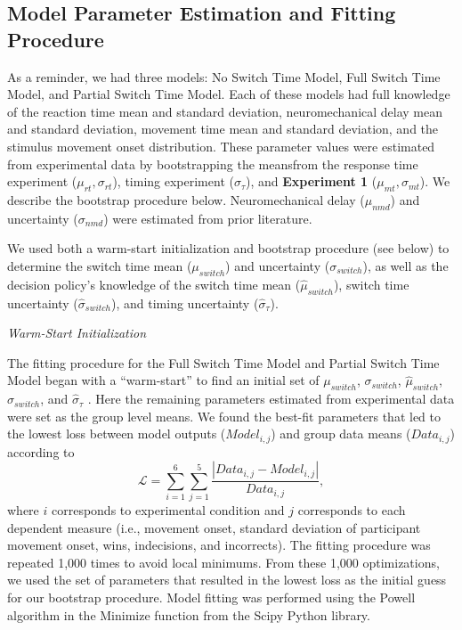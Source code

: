 \documentclass[12pt]{article}
\newcommand\boldblue[1]{\textcolor{mydarkblue}{\textbf{#1}}}
\begin{document}
\vspace{2mm}
\subsection{Model Parameter Estimation and Fitting Procedure}

\noindent As a reminder, we had three models: No Switch Time Model, Full Switch Time Model, and Partial Switch Time Model. Each of these models had full knowledge of the reaction time mean and standard deviation, neuromechanical delay mean and standard deviation, movement time mean and standard deviation, and the stimulus movement onset distribution. These parameter values were estimated from experimental data by bootstrapping the meansfrom the response time experiment ($\mu_{rt}, \sigma_{rt}$), timing experiment ($\sigma_{\tau}$), and \boldblue{Experiment 1} ($\mu_{mt}, \sigma_{mt}$). We describe the bootstrap procedure below. Neuromechanical delay ($\mu_{nmd}$) and uncertainty ($\sigma_{nmd}$) were estimated from prior literature\autocite*{normanElectromechanicalDelaySkeletal1979,rossiniClinicalApplicationsMotor1998,brucePrimateFrontalEye1985}.

We used both a warm-start initialization and bootstrap procedure (see below) to determine the switch time mean ($\mu_{switch}$) and uncertainty ($\sigma_{switch}$), as well as the decision policy’s knowledge of the switch time mean ($\hat{\mu}_{switch}$), switch time uncertainty ($\hat{\sigma}_{switch}$), and timing uncertainty ($\hat{\sigma}_{\tau}$).

\vspace{2mm}
\noindent\emph{Warm-Start Initialization}

\noindent The fitting procedure for the Full Switch Time Model and Partial Switch Time Model began with a “warm-start” to find an initial set of $\mu_{switch}$, $\sigma_{switch}$, $\hat{\mu}_{switch}$, $\hat{\sigma}_{switch}$, and $\hat{\sigma}_{\tau}$ \autocite*{rothReinforcementbasedProcessesActively2023,rothPunishmentLeadsGreater2024}.  Here the remaining parameters estimated from experimental data were set as the group level means. We found the best-fit parameters that led to the lowest loss between model outputs ($Model_{i,j}$) and group data means ($Data_{i,j}$) according to
\begin{equation}
    \mathcal{L} = \sum_{i = 1}^{6} \sum_{j = 1}^{5} \frac{|Data_{i,j} - Model_{i,j}|}{Data_{i,j}},
\end{equation}
where $i$ corresponds to experimental condition and $j$ corresponds to each dependent measure (i.e., movement onset, standard deviation of participant movement onset, wins, indecisions, and incorrects). The fitting procedure was repeated 1,000 times to avoid local minimums. From these 1,000 optimizations, we used the set of parameters that resulted in the lowest loss as the initial guess for our bootstrap procedure. Model fitting was performed using the Powell algorithm in the Minimize function from the Scipy Python library.
\end{document}
